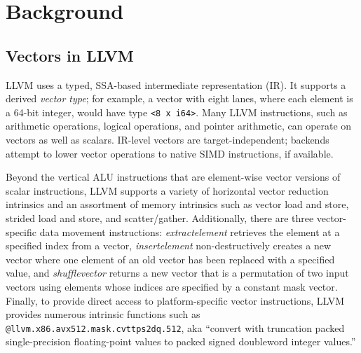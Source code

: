 \section{Background}
\label{sec:background}

\subsection{Vectors in LLVM}

LLVM uses a typed, SSA-based intermediate representation (IR).
%
It supports a derived \emph{vector type}; for example, a vector with
eight lanes, where each element is a 64-bit integer, would have type
\texttt{<8 x i64>}.
%
Many LLVM instructions, such as arithmetic operations, logical operations,
and pointer arithmetic, can operate on vectors as well as scalars.
%
IR-level vectors are target-independent; backends attempt to lower
vector operations to native SIMD instructions, if available.


Beyond the vertical ALU instructions that are element-wise vector
versions of scalar instructions, LLVM supports a variety of horizontal
vector reduction intrinsics and an assortment of memory intrinsics
such as vector load and store, strided load and store, and
scatter/gather.
%
Additionally, there are three vector-specific data movement
instructions:
%
\textit{extractelement} retrieves the element at a specified index from
a vector,
%
\textit{insertelement} non-destructively creates a new vector where
one element of an old vector has been replaced with a specified value,
%
and \textit{shufflevector} returns a new vector that is a permutation
of two input vectors using elements whose indices are specified by a
constant mask vector.
%
Finally, to provide direct access to platform-specific vector
instructions, LLVM provides numerous intrinsic functions such as
\texttt{@llvm.x86.avx512.mask.cvttps2dq.512}, aka ``convert with
truncation packed single-precision floating-point values to packed
signed doubleword integer values.''


\iffalse
An omnipresent semantic complication at the LLVM IR level is undefined
behavior in the form of \emph{poison} values, the \emph{undef} value,
and immediate undefined behavior~\cite{taming}.
%
For example, the LLVM language reference manual specifies that for the
shufflevector instruction:
%
\begin{quote}
If the shuffle mask is undefined, the result vector is undefined. If
the shuffle mask selects an undefined element from one of the input
vectors, the resulting element is undefined. An undefined element in
the mask vector specifies that the resulting element is undefined. An
undefined element in the mask vector prevents a poisoned vector
element from propagating.
\end{quote}
%
These rules can have counterintuitive effects on vector optimizations.
\fi


